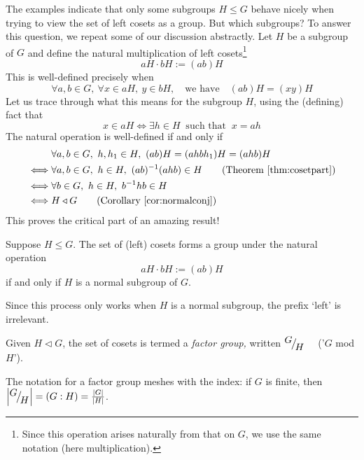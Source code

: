 
The examples indicate that only some subgroups $H\le G$ behave nicely when trying to view the set of left cosets as a group. But which subgroups? To answer this question, we repeat some of our discussion abstractly. Let $H$ be a subgroup of $G$ and define the natural multiplication of left cosets\footnote{Since this operation arises naturally from that on $G$, we use the same notation (here multiplication).}
\[
	aH\cdot bH:=(ab)H
\]
This is well-defined precisely when
\[
	\forall a,b\in G,\ \forall x\in aH,\ y\in bH,
	\quad \text{we have}\quad 
	(ab)H=(xy)H
\]
Let us trace through what this means for the subgroup $H$, using the (defining) fact that 
\[
	x\in aH\iff \exists h\in H\ \text{ such that }\  x=ah
\]
The natural operation is well-defined if and only if
\begin{align*}
	&\forall a,b\in G,\ h,h_1\in H,\ (ab)H=(ahbh_1)H=(ahb)H\\
	\iff &\forall a,b\in G,\ h\in H,\ (ab)^{-1}(ahb)\in H \tag{Theorem \ref{thm:cosetpart}}\\
	\iff &\forall b\in G,\ h\in H,\ b^{-1}hb\in H\\
	\iff&H\triangleleft G \tag{Corollary \ref{cor:normalconj}}
\end{align*}
This proves the critical part of an amazing result!

\begin{thm}{}{}
	Suppose $H\le G$. The set of (left) cosets forms a group under the natural operation
	\[
		aH\cdot bH:=(ab)H \tag{$\ast$}
	\]
	if and only if $H$ is a normal subgroup of $G$.
\end{thm}

Since this process only works when $H$ is a normal subgroup, the prefix `left' is irrelevant.

\begin{defn}{}{}
	Given $H\triangleleft G$, the set of cosets is termed a \emph{factor group,} written ${}^{\textstyle {G}}\!\big/_{\textstyle \!{H}}$ \ \ ('$G$ mod $H$').
\end{defn}

The notation for a factor group meshes with the index: if $G$ is finite, then $\left| {}^{\textstyle {G}}\!\big/_{\textstyle \!{H}}\right|=(G:H)=\frac{\left| G\right|}{\left| H\right|}$.



